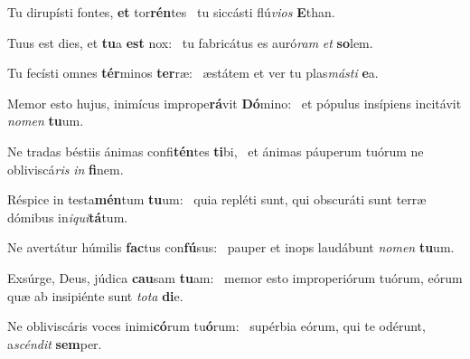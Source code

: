 \item Tu dirupísti fontes, \textbf{et} tor\textbf{rén}tes~\psstar{} tu siccásti flú\textit{vios} \textbf{E}than.
\item Tuus est dies, et \textbf{tu}a \textbf{est} nox:~\psstar{} tu fabricátus es auró\textit{ram} \textit{et} \textbf{so}lem.
\item Tu fecísti omnes \textbf{tér}minos \textbf{ter}ræ:~\psstar{} æstátem et ver tu plas\textit{másti} \textbf{e}a.
\item Memor esto hujus, inimícus imprope\textbf{rá}vit \textbf{Dó}mino:~\psstar{} et pópulus insípiens incitávit \textit{nomen} \textbf{tu}um.
\item Ne tradas béstiis ánimas confi\textbf{tén}tes \textbf{ti}bi,~\psstar{} et ánimas páuperum tuórum ne obliviscá\textit{ris} \textit{in} \textbf{fi}nem.
\item Réspice in testa\textbf{mén}tum \textbf{tu}um:~\psstar{} quia repléti sunt, qui obscuráti sunt terræ dómibus in\textit{iqui}\textbf{tá}tum.
\item Ne avertátur húmilis \textbf{fac}tus con\textbf{fú}sus:~\psstar{} pauper et inops laudábunt \textit{nomen} \textbf{tu}um.
\item Exsúrge, Deus, júdica \textbf{cau}sam \textbf{tu}am:~\psstar{} memor esto improperiórum tuórum, eórum quæ ab insipiénte sunt \textit{tota} \textbf{di}e.
\item Ne obliviscáris voces inimi\textbf{có}rum tu\textbf{ó}rum:~\psstar{} supérbia eórum, qui te odérunt, a\textit{scéndit} \textbf{sem}per.
